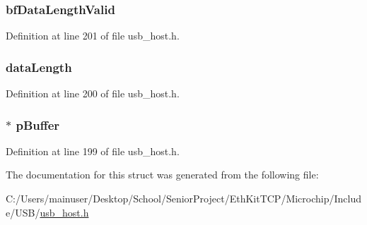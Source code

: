 \subsubsection[{bf\+Data\+Length\+Valid}]{ bf\+Data\+Length\+Valid}\label{struct___i_s_o_c_h_r_o_n_o_u_s___d_a_t_a___b_u_f_f_e_r_aceafa556fbaf1fef5d03393c9d150fec}


Definition at line 201 of file usb\+\_\+host.\+h.

\hypertarget{struct___i_s_o_c_h_r_o_n_o_u_s___d_a_t_a___b_u_f_f_e_r_a0398f1b8d05aedd831ce3c1b79500b5f}{}
\subsubsection[{data\+Length}]{ data\+Length}\label{struct___i_s_o_c_h_r_o_n_o_u_s___d_a_t_a___b_u_f_f_e_r_a0398f1b8d05aedd831ce3c1b79500b5f}


Definition at line 200 of file usb\+\_\+host.\+h.

\hypertarget{struct___i_s_o_c_h_r_o_n_o_u_s___d_a_t_a___b_u_f_f_e_r_a81bba27029571d8801e39f24898ddaa0}{}
\subsubsection[{p\+Buffer}]{$\ast$ p\+Buffer}\label{struct___i_s_o_c_h_r_o_n_o_u_s___d_a_t_a___b_u_f_f_e_r_a81bba27029571d8801e39f24898ddaa0}


Definition at line 199 of file usb\+\_\+host.\+h.



The documentation for this struct was generated from the following file\+:\begin{DoxyCompactItemize}
\item 
C\+:/\+Users/mainuser/\+Desktop/\+School/\+Senior\+Project/\+Eth\+Kit\+T\+C\+P/\+Microchip/\+Include/\+U\+S\+B/\hyperlink{usb__host_8h}{usb\+\_\+host.\+h}\end{DoxyCompactItemize}
